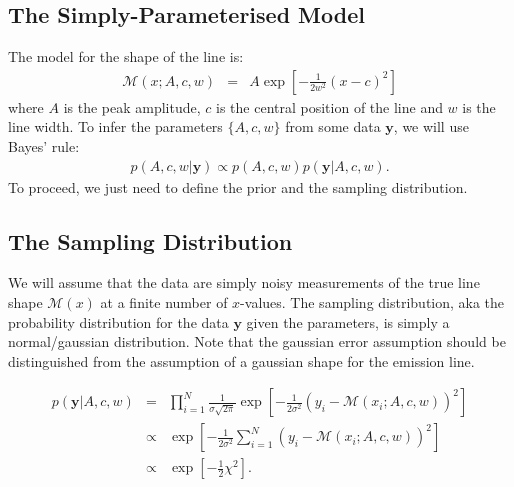 \documentclass[letterpaper, 11pt]{article}
\newcommand{\yy}{\mathbf{y}}
\begin{document}
\subsection{The Simply-Parameterised Model}
The model for the shape of the line is:
\begin{eqnarray}
\mathcal{M}(x; A, c, w) &=&
A\exp
\left[
-\frac{1}{2w^2}
\left(x - c\right)^2
\right]
\end{eqnarray}
where $A$ is the peak amplitude, $c$ is the central position of the line
and $w$ is the line width. To infer the parameters $\{A, c, w\}$ from some data
$\yy$, we will use Bayes' rule:
\begin{eqnarray}
p(A, c, w | \yy) \propto p(A, c, w)p(\yy | A, c, w).
\end{eqnarray}
To proceed, we just need to define the prior and the sampling distribution.

\subsection{The Sampling Distribution}
We will assume that the data are simply noisy measurements of the true line shape
$\mathcal{M}(x)$ at a finite number of $x$-values.
The sampling distribution, aka the probability distribution for the data $\yy$ given
the parameters, is simply a normal/gaussian distribution. Note that the
gaussian error assumption should be distinguished from the assumption of a gaussian
shape for the emission line.

\begin{eqnarray}
p(\yy|A, c, w) &=& \prod_{i=1}^N
\frac{1}{\sigma\sqrt{2\pi}}
\exp
\left[
-\frac{1}{2\sigma^2}\left(y_i - \mathcal{M}(x_i; A, c, w)\right)^2
\right] \\
&\propto& \exp\left[-\frac{1}{2\sigma^2}\sum_{i=1}^N\left(y_i - \mathcal{M}(x_i; A, c, w)\right)^2\right] \\
&\propto& \exp\left[-\frac{1}{2}\chi^2\right].
\end{eqnarray}
\end{document}
